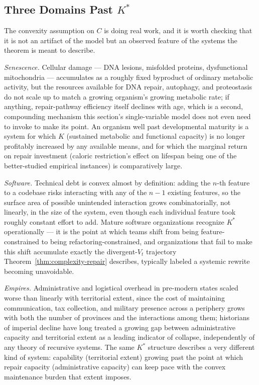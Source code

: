 \documentclass[11pt,a4paper]{article}
\theoremstyle{plain}
\theoremstyle{definition}
\theoremstyle{remark}
\begin{document}
\subsection{Three Domains Past $K^\ast$}
\label{subsec:three-domains}

The convexity assumption on $C$ is doing real work, and it is worth checking that it is not an artifact of the model but an observed feature of the systems the theorem is meant to describe.

\emph{Senescence.} Cellular damage — DNA lesions, misfolded proteins, dysfunctional mitochondria — accumulates as a roughly fixed byproduct of ordinary metabolic activity, but the resources available for DNA repair, autophagy, and proteostasis do not scale up to match a growing organism's growing metabolic rate; if anything, repair-pathway efficiency itself declines with age, which is a second, compounding mechanism this section's single-variable model does not even need to invoke to make its point. An organism well past developmental maturity is a system for which $K$ (sustained metabolic and functional capacity) is no longer profitably increased by any available means, and for which the marginal return on repair investment (caloric restriction's effect on lifespan being one of the better-studied empirical instances) is comparatively large.

\emph{Software.} Technical debt is convex almost by definition: adding the $n$-th feature to a codebase risks interacting with any of the $n-1$ existing features, so the surface area of possible unintended interaction grows combinatorially, not linearly, in the size of the system, even though each individual feature took roughly constant effort to add. Mature software organizations recognize $K^\ast$ operationally — it is the point at which teams shift from being feature-constrained to being refactoring-constrained, and organizations that fail to make this shift accumulate exactly the divergent-$V_t$ trajectory Theorem~\ref{thm:complexity-repair} describes, typically labeled a systemic rewrite becoming unavoidable.

\emph{Empires.} Administrative and logistical overhead in pre-modern states scaled worse than linearly with territorial extent, since the cost of maintaining communication, tax collection, and military presence across a periphery grows with both the number of provinces and the interactions among them; historians of imperial decline have long treated a growing gap between administrative capacity and territorial extent as a leading indicator of collapse, independently of any theory of recursive systems. The same $K^\ast$ structure describes a very different kind of system: capability (territorial extent) growing past the point at which repair capacity (administrative capacity) can keep pace with the convex maintenance burden that extent imposes.
\end{document}
